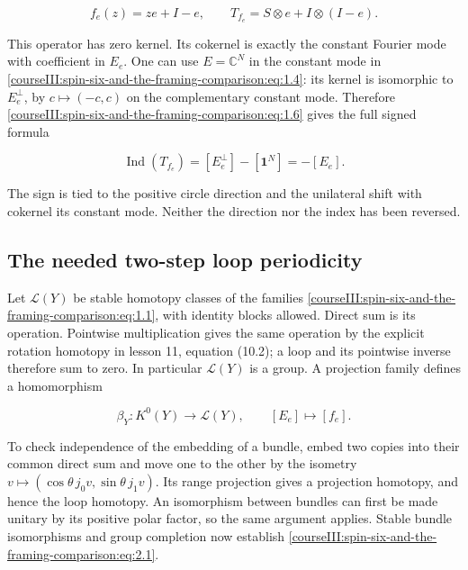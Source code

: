 \begin{equation}
f_e(z)=ze+I-e,
\qquad T_{f_e}=S\otimes e+I\otimes(I-e).
\label{courseIII:spin-six-and-the-framing-comparison:eq:1.8}
\end{equation}

This operator has zero kernel. Its cokernel is exactly the constant Fourier mode with coefficient in \(E_e\). One can use \(E=\mathbb C^N\) in the constant mode in \eqref{courseIII:spin-six-and-the-framing-comparison:eq:1.4}: its kernel is isomorphic to \(E_e^\perp\), by \(c\mapsto(-c,c)\) on the complementary constant mode. Therefore \eqref{courseIII:spin-six-and-the-framing-comparison:eq:1.6} gives the full signed formula

\begin{equation}
\operatorname{Ind}(T_{f_e})
=[E_e^\perp]-[\mathbf1^N]=-[E_e].
\label{courseIII:spin-six-and-the-framing-comparison:eq:1.9}
\end{equation}

The sign is tied to the positive circle direction and the unilateral shift with cokernel its constant mode. Neither the direction nor the index has been reversed.

\subsection{The needed two-step loop periodicity}
\label{courseIII:spin-six-and-the-framing-comparison:framing-loop-periodicity}

\label{courseIII:spin-six-and-the-framing-comparison:section-2}\label{courseIII:spin6:2}

Let \(\mathcal L(Y)\) be stable homotopy classes of the families \eqref{courseIII:spin-six-and-the-framing-comparison:eq:1.1}, with identity blocks allowed. Direct sum is its operation. Pointwise multiplication gives the same operation by the explicit rotation homotopy in lesson 11, equation (10.2); a loop and its pointwise inverse therefore sum to zero. In particular \(\mathcal L(Y)\) is a group. A projection family defines a homomorphism

\begin{equation}
\beta_Y:K^0(Y)\longrightarrow\mathcal L(Y),
\qquad [E_e]\longmapsto[f_e].
\label{courseIII:spin-six-and-the-framing-comparison:eq:2.1}
\end{equation}

To check independence of the embedding of a bundle, embed two copies into their common direct sum and move one to the other by the isometry \(v\mapsto(\cos\theta\,j_0v,\sin\theta\,j_1v)\). Its range projection gives a projection homotopy, and hence the loop homotopy. An isomorphism between bundles can first be made unitary by its positive polar factor, so the same argument applies. Stable bundle isomorphisms and group completion now establish \eqref{courseIII:spin-six-and-the-framing-comparison:eq:2.1}.

